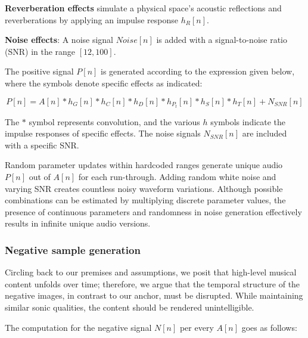 \textbf{Reverberation effects} simulate a physical space's acoustic reflections and reverberations by applying an impulse response $h_R[n]$.

\textbf{Noise effects}: A noise signal $Noise[n]$ is added with a signal-to-noise ratio (SNR) in the range $[12, 100]$.

The positive signal $P[n]$ is generated according to the expression given below, where the symbols denote specific effects as indicated:

\begin{equation}\label{eq:positive_signal}
P[n] = A[n] \ast h_{G}[n] \ast h_{C}[n] \ast h_{D}[n] \ast h_{P_t}[n] \ast h_{S}[n] \ast h_{T}[n] + N_{SNR}[n]
\end{equation}

The $\ast$ symbol represents convolution, and the various $h$ symbols indicate the impulse responses of specific effects. The noise signals $N_{SNR}[n]$ are included with a specific SNR.

Random parameter updates within hardcoded ranges generate unique audio $P[n]$ out of $A[n]$ for each run-through. Adding random white noise and varying SNR creates countless noisy waveform variations. Although possible combinations can be estimated by multiplying discrete parameter values, the presence of continuous parameters and randomness in noise generation effectively results in infinite unique audio versions.

\subsubsection{Negative sample generation}

Circling back to our premises and assumptions, we posit that high-level musical content unfolds over time; therefore, we argue that the temporal structure of the negative images, in contrast to our anchor, must be disrupted. While maintaining similar sonic qualities, the content should be rendered unintelligible.

The computation for the negative signal $N[n]$ per every $A[n]$ goes as follows:

